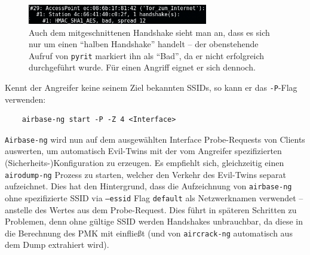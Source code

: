 \begin{figure}[ht]
	\centering
	\includegraphics[width=0.7\textwidth]{graphics/pyrit_analyze}
	\caption[Pyrit]{Auch dem mitgeschnittenen Handshake sieht man an, dass es sich nur um einen \enquote{halben Handshake} handelt -- der obenstehende Aufruf von \texttt{pyrit} markiert ihn als \enquote{Bad}, da er nicht erfolgreich durchgeführt wurde. Für einen Angriff eignet er sich dennoch.}
\end{figure}
\FloatBarrier

Kennt der Angreifer keine seinem Ziel bekannten SSIDs, so kann er das \texttt{-P}-Flag verwenden:
\begin{Verbatim}
	airbase-ng start -P -Z 4 <Interface>
\end{Verbatim}

\texttt{Airbase-ng} wird nun auf dem ausgewählten Interface Probe-Requests von Clients auswerten, um automatisch Evil-Twins mit der vom Angreifer spezifizierten (Sicherheits-)Konfiguration zu erzeugen.
Es empfiehlt sich, gleichzeitig einen \texttt{airodump-ng} Prozess zu starten, welcher den Verkehr des Evil-Twins separat aufzeichnet.
Dies hat den Hintergrund, dass die Aufzeichnung von \texttt{airbase-ng} ohne spezifizierte SSID via \texttt{--essid} Flag \texttt{default} als Netzwerknamen verwendet -- anstelle des Wertes aus dem Probe-Request. Dies führt in späteren Schritten zu Problemen, denn ohne gültige SSID werden Handshakes unbrauchbar, da diese in die Berechnung des PMK mit einfließt (und von \texttt{aircrack-ng} automatisch aus dem Dump extrahiert wird).

